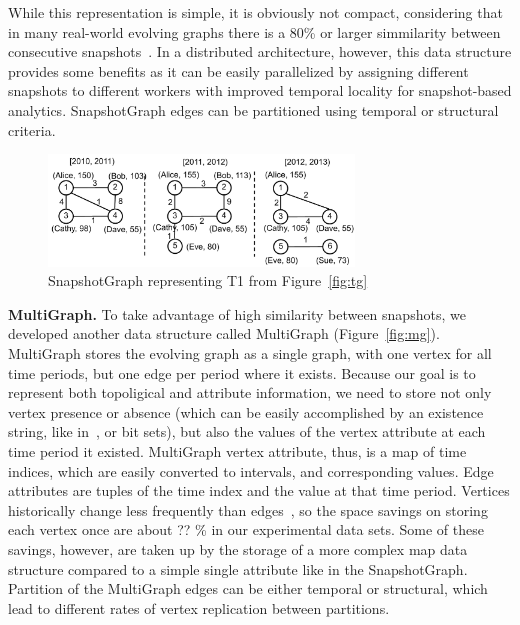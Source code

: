 While this representation is simple, it is obviously not compact,
considering that in many real-world evolving graphs there is a 80\% or
larger simmilarity between consecutive
snapshots~\cite{DBLP:journals/tos/MiaoHLWYZPCC15}.  In a distributed
architecture, however, this data structure provides some
benefits as it can be easily parallelized by assigning different
snapshots to different workers with improved temporal locality for
snapshot-based analytics.  SnapshotGraph edges can be partitioned
using temporal or structural criteria.  

\begin{figure}[t!]
\includegraphics[width=3.2in]{figs/sgp.pdf}
\caption{SnapshotGraph representing T1 from Figure~\ref{fig:tg}}
\label{fig:sgp}
\end{figure}

{\bf MultiGraph.}  To take advantage of high similarity between
snapshots, we developed another data structure called MultiGraph
(Figure~\ref{fig:mg}).  MultiGraph stores the evolving graph as a
single graph, with one vertex for all time periods, but one edge per
period where it exists.  Because our goal is to represent both
topoligical and attribute information, we need to store not only
vertex presence or absence (which can be easily accomplished by an
existence string, like in~\cite{Kan2009}, or bit sets), but also the
values of the vertex attribute at each time period it existed.
MultiGraph vertex attribute, thus, is a map of time indices, which are
easily converted to intervals, and corresponding values.  Edge
attributes are tuples of the time index and the value at that time
period.  Vertices historically change less frequently than
edges~\cite{?}, so the space savings on storing each vertex once are
about ?? \% in our experimental data sets.  Some of these savings,
however, are taken up by the storage of a more complex map data
structure compared to a simple single attribute like in the
SnapshotGraph.  Partition of the MultiGraph edges can be either
temporal or structural, which lead to different rates of vertex
replication between partitions.

